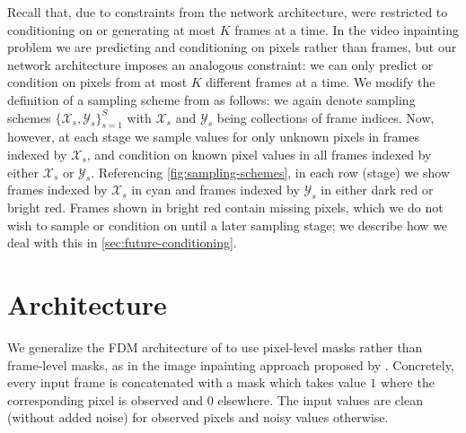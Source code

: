 Recall that, due to constraints from the network architecture, \citet{fdm} were restricted to conditioning on or generating at most $K$ frames at a time. In the video inpainting problem we are predicting and conditioning on pixels rather than frames, but our network architecture imposes an analogous constraint: we can only predict or condition on pixels from at most $K$ different frames at a time. We modify the definition of a sampling scheme from \citet{fdm} as follows: we again denote sampling schemes $\{\mathcal{X}_s, \mathcal{Y}_s\}_{s=1}^S$ with $\mathcal{X}_s$ and $\mathcal{Y}_s$ being collections of frame indices. Now, however, at each stage we sample values for only unknown pixels in frames indexed by $\mathcal{X}_s$, and condition on known pixel values in all frames indexed by either $\mathcal{X}_s$ or $\mathcal{Y}_s$. Referencing \cref{fig:sampling-schemes}, in each row (stage) we show frames indexed by $\mathcal{X}_s$ in \textcolor{latentcolor}{cyan} and frames indexed by $\mathcal{Y}_s$ in either \textcolor{observedpastcolor}{dark red} or \textcolor{observedfuturecolor}{bright red}. Frames shown in \textcolor{observedfuturecolor}{bright red} contain missing pixels, which we do not wish to sample or condition on until a later sampling stage; we describe how we deal with this in \cref{sec:future-conditioning}.


\section{Architecture}
We generalize the FDM architecture of \citet{fdm} to use pixel-level masks rather than frame-level masks, as in the image inpainting approach proposed by \citet{palette}. Concretely, every input frame is concatenated with a mask which takes value $1$ where the corresponding pixel is observed and $0$ elsewhere. The input values are clean (without added noise) for observed pixels and noisy values otherwise.



